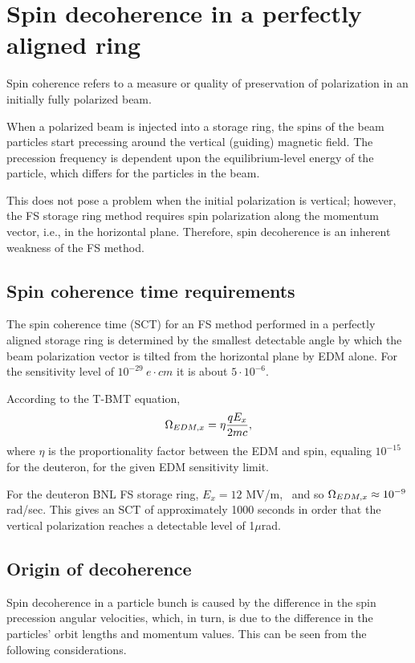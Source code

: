 \documentclass{article}
\begin{document}
\tableofcontents
\newpage

\section{Spin decoherence in a perfectly aligned ring}
Spin coherence refers to a measure or quality of preservation of polarization in an initially fully polarized beam.~\citep[p.~205]{Eremey:Thesis}

When a polarized beam is injected into a storage ring, the spins of the beam particles start precessing around the vertical (guiding) magnetic field. The precession frequency is dependent upon the equilibrium-level energy of the particle, which differs for the particles in the beam.

This does not pose a problem when the initial polarization is vertical; however, the FS storage ring method requires spin polarization along the momentum vector, i.e., in the horizontal plane. Therefore, spin decoherence is an inherent weakness of the FS method.

\subsection{Spin coherence time requirements}
The spin coherence time (SCT) for an FS method performed in a perfectly aligned storage ring is determined by the smallest detectable angle by which the beam polarization vector is tilted from the horizontal plane by EDM alone. For the sensitivity level of $10^{-29}~e\cdot cm$ it is about $5\cdot10^{-6}$.~\cite{BNL:Deuteron2008}

According to the T-BMT equation,
\[
\Omega_{EDM,x} = \eta\frac{qE_x}{2mc},
\]
where $\eta$ is the proportionality factor between the EDM and spin, equaling $10^{-15}$ for the deuteron, for the given EDM sensitivity limit.~\citep[p.~206]{Eremey:Thesis}

For the deuteron BNL FS storage ring, $E_x = 12$ MV/m,~\citep[p.~19]{BNL:Deuteron2008} and so $\Omega_{EDM,x}\approx 10^{-9}$ rad/sec. This gives an SCT of approximately 1000 seconds in order that the vertical polarization reaches a detectable level of 1$\mu$rad.~\citep[p.~207]{Eremey:Thesis}

\subsection{Origin of decoherence}\label{sec:Decoh_origin}
Spin decoherence in a particle bunch is caused by the difference in the spin precession angular velocities, which, in turn, is due to the difference in the particles' orbit lengths and momentum values. This can be seen from the following considerations.
\end{document}
